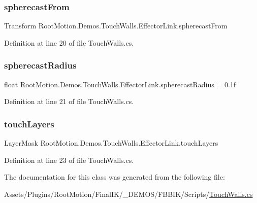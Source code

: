 \subsubsection{\texorpdfstring{spherecast\+From}{spherecastFrom}}
{\footnotesize\ttfamily Transform Root\+Motion.\+Demos.\+Touch\+Walls.\+Effector\+Link.\+spherecast\+From}



Definition at line 20 of file Touch\+Walls.\+cs.

\mbox{\label{class_root_motion_1_1_demos_1_1_touch_walls_1_1_effector_link_a6d48ef98f8bd83df8bb002f8e8b7cdff}} 
\subsubsection{\texorpdfstring{spherecast\+Radius}{spherecastRadius}}
{\footnotesize\ttfamily float Root\+Motion.\+Demos.\+Touch\+Walls.\+Effector\+Link.\+spherecast\+Radius = 0.\+1f}



Definition at line 21 of file Touch\+Walls.\+cs.

\mbox{\label{class_root_motion_1_1_demos_1_1_touch_walls_1_1_effector_link_a05c65e03e34ce7c256848bc01af5f6ea}} 
\subsubsection{\texorpdfstring{touch\+Layers}{touchLayers}}
{\footnotesize\ttfamily Layer\+Mask Root\+Motion.\+Demos.\+Touch\+Walls.\+Effector\+Link.\+touch\+Layers}



Definition at line 23 of file Touch\+Walls.\+cs.



The documentation for this class was generated from the following file\+:\begin{DoxyCompactItemize}
\item 
Assets/\+Plugins/\+Root\+Motion/\+Final\+I\+K/\+\_\+\+D\+E\+M\+O\+S/\+F\+B\+B\+I\+K/\+Scripts/\mbox{\hyperlink{_touch_walls_8cs}{Touch\+Walls.\+cs}}\end{DoxyCompactItemize}
